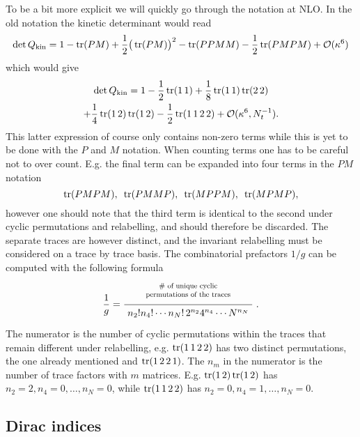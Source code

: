 To be a bit more explicit we will quickly go through the notation at NLO. In the
old notation the kinetic determinant would read
%
\begin{equation}
  \det Q_{\text{kin}} = 1 - \operatorname{tr}(PM) + \frac{1}{2} \big(\operatorname{tr}(PM)\big)^2 - \operatorname{tr}(PPMM) -
    \frac{1}{2} \operatorname{tr}(PMPM) + \mathcal{O}(\kappa^6)
\end{equation}
%
which would give
%
\begin{multline}
  \det Q_{\text{kin}} = 
    1 - \frac{1}{2} \operatorname{tr}(1\,1) + \frac{1}{8} \operatorname{tr}(1\,1) \operatorname{tr}(2\,2) \\
    + \frac{1}{4}\operatorname{tr} (1\,2) \operatorname{tr} (1\,2) - \frac{1}{2} \operatorname{tr}(1\,1\,2\,2) +
    \mathcal{O}(\kappa^6, N_t^{-1}).
\end{multline}
%
This latter expression of course only contains non-zero terms while this is yet
to be done with the $P$ and $M$ notation. When counting terms one has to be
careful not to over count. E.g. the final term can be expanded into four terms
in the $PM$ notation
%
\begin{equation}
  \operatorname{tr}(PMPM), \hskip.5em \operatorname{tr}(PMMP), \hskip.5em \operatorname{tr}(MPPM), \hskip.5em \operatorname{tr}(MPMP),
\end{equation}
%
however one should note that the third term is identical to the second under
cyclic permutations and relabelling, and should therefore be discarded. The
separate traces are however distinct, and the invariant relabelling must be
considered on a trace by trace basis. The combinatorial prefactors $1/g$ can be
computed with the following formula
%
\begin{equation}
  \frac{1}{g}=
    \frac{%
      \tikz \node [anchor=north east,scale=0.75,align=center] {\# of unique cyclic \\ permutations of the traces};
    }{%
      \tikz \node {$n_2!n_4!\cdots{}n_N!\, 2^{n_2} 4^{n_4} \cdots N^{n_N}$};
    } \;.
\end{equation}
%
The numerator is the number of cyclic permutations within the traces that
remain different under relabelling, e.g. $\operatorname{tr}(1\,1\,2\,2)$ has two distinct
permutations, the one already mentioned and $\operatorname{tr}(1\,2\,2\,1)$. The $n_m$ in the
numerator is the number of trace factors with $m$ matrices. E.g.
$\operatorname{tr}(1\,2)\operatorname{tr}(1\,2)$ has $n_2 = 2, n_4 = 0, \dots, n_N = 0$, while
$\operatorname{tr}(1\,1\,2\,2)$ has $n_2 = 0, n_4 = 1, \dots, n_N = 0$.

\subsection{Dirac indices}

